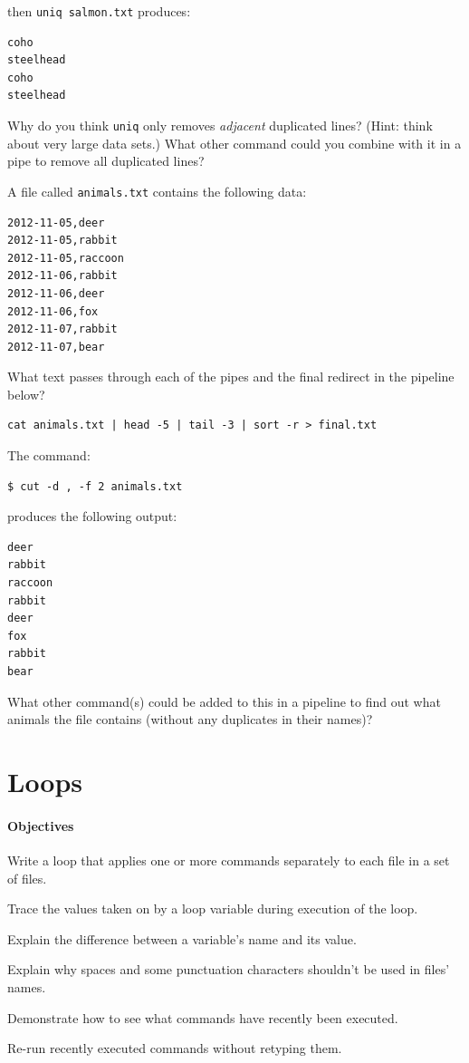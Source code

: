 \documentclass{book}
\begin{document}
\begin{swcenumerate}
  then \texttt{uniq salmon.txt} produces:

\begin{verbatim}
coho
steelhead
coho
steelhead
\end{verbatim}

  Why do you think \texttt{uniq} only removes \emph{adjacent} duplicated
  lines? (Hint: think about very large data sets.) What other command
  could you combine with it in a pipe to remove all duplicated lines?
\item
  A file called \texttt{animals.txt} contains the following data:

\begin{verbatim}
2012-11-05,deer
2012-11-05,rabbit
2012-11-05,raccoon
2012-11-06,rabbit
2012-11-06,deer
2012-11-06,fox
2012-11-07,rabbit
2012-11-07,bear
\end{verbatim}

  What text passes through each of the pipes and the final redirect in
  the pipeline below?

\begin{verbatim}
cat animals.txt | head -5 | tail -3 | sort -r > final.txt
\end{verbatim}
\item
  The command:

\begin{verbatim}
$ cut -d , -f 2 animals.txt
\end{verbatim}

  produces the following output:

\begin{verbatim}
deer
rabbit
raccoon
rabbit
deer
fox
rabbit
bear
\end{verbatim}

  What other command(s) could be added to this in a pipeline to find out
  what animals the file contains (without any duplicates in their
  names)?
\end{swcenumerate}

\section{Loops}

\mbox{}\paragraph{Objectives}

\begin{swcitemize}
\item
  Write a loop that applies one or more commands separately to each file
  in a set of files.
\item
  Trace the values taken on by a loop variable during execution of the
  loop.
\item
  Explain the difference between a variable's name and its value.
\item
  Explain why spaces and some punctuation characters shouldn't be used
  in files' names.
\item
  Demonstrate how to see what commands have recently been executed.
\item
  Re-run recently executed commands without retyping them.
\end{swcitemize}
\end{document}
